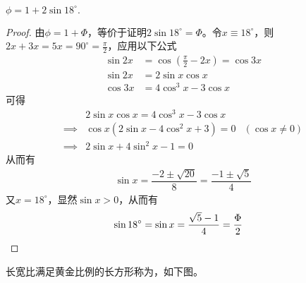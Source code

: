 \begin{example}[三角函数表示]
  $\phi=1 + 2\sin18^\circ.$
\end{example}
\begin{proof}
  由$\phi=1+\Phi$，等价于证明$2\sin18^\circ=\Phi$。令$x\equiv18^\circ$，则$2x+3x=5x=90^\circ=\frac\pi2$，应用以下公式
  \begin{align*}
    \sin 2x &= \cos \left(\frac\pi2 - 2x\right) = \cos 3x\\
    \sin 2x &=2\sin x\cos x\\
    \cos 3x &= 4\cos^3x-3\cos x
  \end{align*}
  可得
  \begin{align*}
    &2\sin x\cos x = 4\cos^3x-3\cos x\\
    \implies& \cos x(2\sin x - 4\cos^2 x + 3) = 0  & (\cos x\ne 0)\\
    \implies & 2\sin x + 4\sin^2 x - 1 = 0 
  \end{align*}
  从而有
  \begin{align*}
    \sin x = \dfrac{-2\pm\sqrt{20}}{8}=\dfrac{-1\pm\sqrt5}4
  \end{align*}
又$x=18^\circ$，显然$\sin x>0$，从而有
\begin{align*}
  \sin18^\circ&=\sin x =\dfrac{\sqrt5-1}4=\dfrac\Phi2\qedhere
\end{align*}
\end{proof}

\begin{example}[黄金长方形]
  长宽比满足黄金比例的长方形称为，如下图。\par
  \begin{center}
  \end{center}
\end{example}

